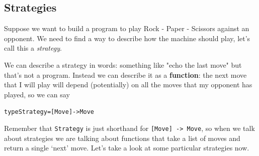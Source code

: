 \subsection*{Strategies}


Suppose we want to build a program to play Rock - Paper - Scissors against an opponent. We need to find a way to describe how the machine should play, let's call this a \emph{strategy}. 

We can describe a strategy in words: something like "echo the last move" but that's not a program. Instead we can describe it as a \textbf{function}: the next move that I will play will depend (potentially) on all the moves that my opponent has played, so we can say
\begin{alltt}
type Strategy = [Move] -> Move
\end{alltt}
Remember that \texttt{Strategy} is just shorthand for \texttt{[Move] -> Move}, so when we talk about strategies we are talking about functions that take a list of moves and return a single  `next' move. Let's take a look at some particular strategies now.


